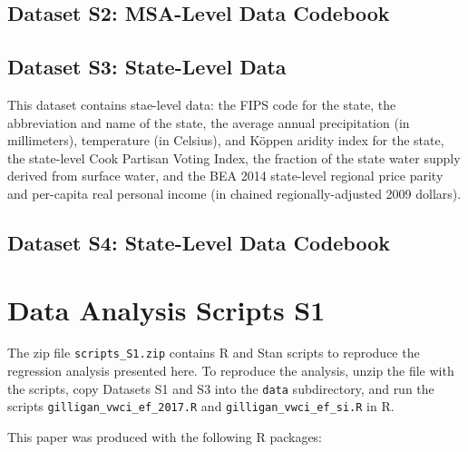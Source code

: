 \documentclass[draft]{agujournal}
\begin{document}
\subsection*{Dataset S2: MSA-Level Data Codebook}


\subsection*{Dataset S3: State-Level Data}

This dataset contains stae-level data: the FIPS code for the state, the abbreviation and name of the state,
the average annual precipitation (in millimeters), temperature (in Celsius), and K\"oppen aridity index for the state,
the state-level Cook Partisan Voting Index,
the fraction of the state water supply derived from surface water,
and the BEA 2014 state-level regional price parity and per-capita real personal income (in chained regionally-adjusted 2009 dollars).

\subsection*{Dataset S4: State-Level Data Codebook}



\section*{Data Analysis Scripts S1}

The zip file \verb+scripts_S1.zip+ contains R and Stan scripts to reproduce the
regression analysis presented here.
To reproduce the analysis, unzip the file with the scripts, copy Datasets S1
and S3 into the \verb+data+ subdirectory, and run the scripts
\verb+gilligan_vwci_ef_2017.R+ and \verb+gilligan_vwci_ef_si.R+ in R.

This paper was produced with the following R packages:
\end{document}
